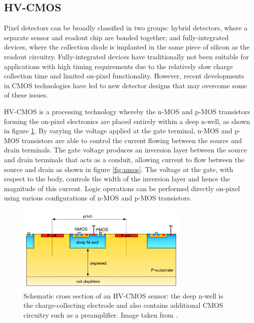 
\subsection{HV-CMOS}
Pixel detectors can be broadly classified in two groups: hybrid detectors, where a separate sensor and readout chip are bonded together; and fully-integrated devices, where the collection diode is implanted in the same piece of silicon as the readout circuitry.  Fully-integrated devices have traditionally not been suitable for applications with high timing requirements due to the relatively slow charge collection time and limited on-pixel functionality.  However, recent developments in CMOS technologies \cite{Weste:2010:CVD:1841628} have led to new detector designs that may overcome some of these issues. 

HV-CMOS is a processing technology whereby the n-MOS and p-MOS transistors forming the on-pixel electronics are placed entirely within a deep n-well, as shown in figure \ref{fig:hvcmos}.  By varying the voltage applied at the gate terminal, n-MOS and p-MOS transistors are able to control the current flowing between the source and drain terminals.  The gate voltage produces an inversion layer between the source and drain terminals that acts as a conduit, allowing current to flow between the source and drain as shown in figure \ref{fig:nmos}.  The voltage at the gate, with respect to the body, controls the width of the inversion layer and hence the magnitude of this current.  Logic operations can be performed directly on-pixel using various configurations of n-MOS and p-MOS transistors.

\begin{figure}[h!]
\centering
\includegraphics[width=0.75\textwidth]{CLICdpVertex/Plots/HV-CMOSDiagram.png}
\caption[Schematic cross section of an HV-CMOS sensor: the deep n-well is the charge-collecting electrode and also contains additional CMOS circuitry such as a preamplifier.  Image taken from \cite{Benoit:2016vup}.]{Schematic cross section of an HV-CMOS sensor: the deep n-well is the charge-collecting electrode and also contains additional CMOS circuitry such as a preamplifier.  Image taken from \cite{Benoit:2016vup}.}\micro
\label{fig:hvcmos}
\end{figure}

